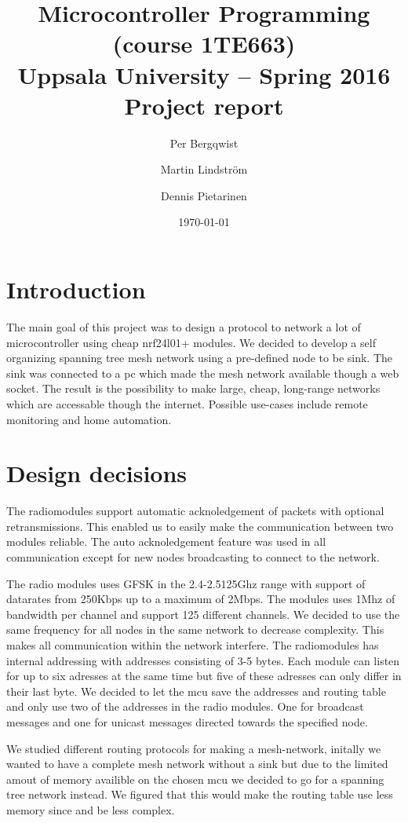 \documentclass[a4paper,11pt]{article}
\title{\textbf{Microcontroller Programming (course 1TE663) \\
    Uppsala University -- Spring 2016 \\
    Project report}}
\author{Per Bergqwist \and Martin Lindström \and Dennis Pietarinen}
\date{\today}
\begin{document}
\maketitle

\tableofcontents

\section{Introduction}
The main goal of this project was to design a protocol to
network a lot of microcontroller using cheap nrf24l01+ modules.  We
decided to develop a self organizing spanning tree mesh network using
a pre-defined node to be sink.  The sink was connected to a pc which
made the mesh network available though a web socket.  The result is
the possibility to make large, cheap, long-range networks which are
accessable though the internet.  Possible use-cases include remote
monitoring and home automation.

\section{Design decisions}
The radiomodules support automatic acknoledgement of packets with
optional retransmissions. This enabled us to easily make the
communication between two modules reliable. The auto acknoledgement
feature was used in all communication except for new nodes
broadcasting to connect to the network.

The radio modules uses GFSK in the 2.4-2.5125Ghz range with support of
datarates from 250Kbps up to a maximum of 2Mbps. The modules uses 1Mhz
of bandwidth per channel and support 125 different channels. We
decided to use the same frequency for all nodes in the same network to
decrease complexity. This makes all communication within the network
interfere. The radiomodules has internal addressing with addresses
consisting of 3-5 bytes. Each module can listen for up to six adresses
at the same time but five of these adresses can only differ in their
last byte. We decided to let the mcu save the addresses and routing
table and only use two of the addresses in the radio modules. One for
broadcast messages and one for unicast messages directed towards the
specified node.

We studied different routing protocols for making a mesh-network,
initally we wanted to have a complete mesh network without a sink but
due to the limited amout of memory availible on the chosen mcu we
decided to go for a spanning tree network instead. We figured that
this would make the routing table use less memory since and be less
complex. 
\end{document}
